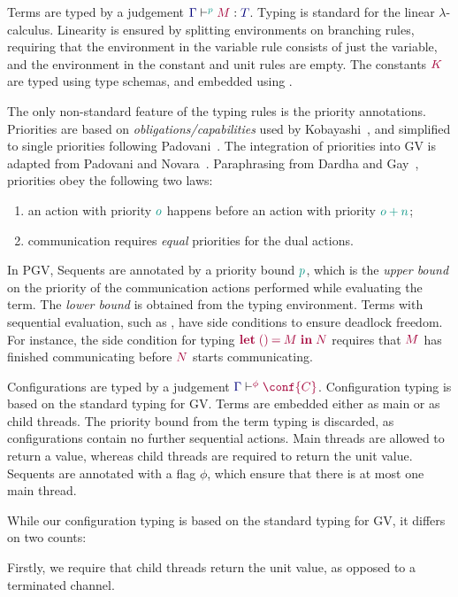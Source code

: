 \documentclass[main.tex]{subfiles}
\begin{document}
Terms are typed by a judgement $\tseq[\cs{p}]{\ty{\Gamma}}{M}{T}$. Typing is standard for the linear $\lambda$-calculus. Linearity is ensured by splitting environments on branching rules, requiring that the environment in the variable rule consists of just the variable, and the environment in the constant and unit rules are empty. The constants $\tm{K}$ are typed using type schemas, and embedded using .

The only non-standard feature of the typing rules is the priority annotations. Priorities are based on \emph{obligations/capabilities} used by Kobayashi~\cite{kobayashi06}, and simplified to single priorities following Padovani~\cite{padovani14}. The integration of priorities into GV is adapted from Padovani and Novara~\cite{padovaninovara15}. Paraphrasing from Dardha and Gay~\cite{dardhagay18}, priorities obey the following two laws:
\begin{enumerate}
  \item an action with priority $\cs{o}$ happens before an action with priority $\cs{o+n}$;
  \item communication requires \emph{equal} priorities for the dual actions.
\end{enumerate}

In PGV, Sequents are annotated by a priority bound $\cs{p}$, which is the \emph{upper bound} on the priority of the communication actions performed while evaluating the term. The \emph{lower bound} is obtained from the typing environment. Terms with sequential evaluation, such as , have side conditions to ensure deadlock freedom. For instance, the side condition for typing $\tm{\letunit{M}{N}}$ requires that $\tm{M}$ has finished communicating before $\tm{N}$ starts communicating.

Configurations are typed by a judgement $\cseq[\phi]{\ty{\Gamma}}{\conf{C}}$. Configuration typing is based on the standard typing for GV. Terms are embedded either as main or as child threads. The priority bound from the term typing is discarded, as configurations contain no further sequential actions. Main threads are allowed to return a value, whereas child threads are required to return the unit value. Sequents are annotated with a flag $\phi$, which ensure that there is at most one main thread.

While our configuration typing is based on the standard typing for GV, it differs on two counts:

Firstly, we require that child threads return the unit value, as opposed to a terminated channel.
\end{document}
